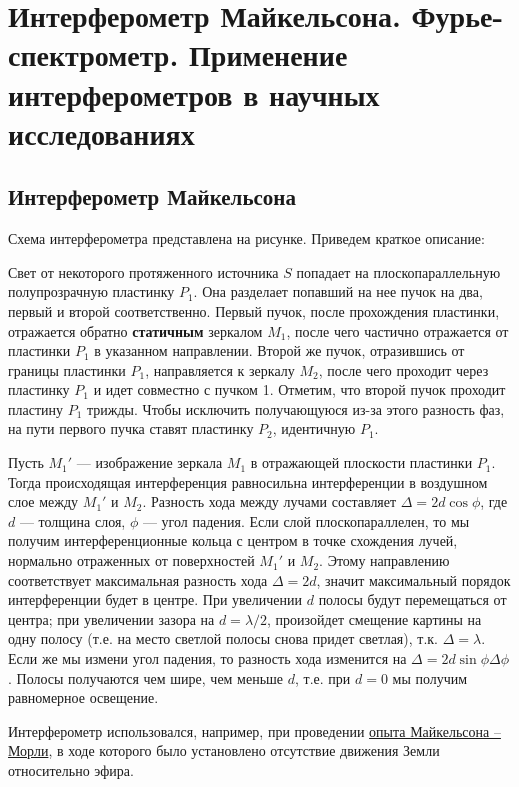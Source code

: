 \section{Интерферометр Майкельсона. Фурье-спектрометр. Применение интерферометров в научных исследованиях}

\subsection{Интерферометр Майкельсона}

Схема интерферометра представлена на рисунке. %
Приведем краткое описание:

Свет от некоторого протяженного источника $S$ попадает на плоскопараллельную полупрозрачную пластинку $P_1$. Она разделает попавший на нее пучок на два, первый и второй соответственно. Первый пучок, после прохождения пластинки, отражается обратно \textbf{статичным} зеркалом $M_1$, после чего частично отражается от пластинки $P_1$ в указанном направлении. Второй же пучок, отразившись от границы пластинки $P_1$, направляется к зеркалу $M_2$, после чего проходит через пластинку $P_1$ и идет совместно с пучком 1. Отметим, что второй пучок проходит пластину $P_1$ трижды. Чтобы исключить получающуюся из-за этого разность фаз, на пути первого пучка ставят пластинку $P_2$, идентичную $P_1$.

Пусть $M_1'$ --- изображение зеркала $M_1$ в отражающей плоскости пластинки $P_1$. Тогда происходящая интерференция равносильна интерференции в воздушном слое между $M_1'$ и $M_2$. Разность хода между лучами составляет $\Delta = 2 d\cos \phi$, где $d$ --- толщина слоя, $\phi$ --- угол падения. Если слой плоскопараллелен, то мы получим интерференционные кольца с центром в точке схождения лучей, нормально отраженных от поверхностей $M_1'$ и $M_2$. Этому направлению соответствует максимальная разность хода $\Delta = 2 d$, значит максимальный порядок интерференции будет в центре. При увеличении $d$ полосы будут перемещаться от центра; при увеличении зазора на $d = \lambda/2$, произойдет смещение картины на одну полосу (т.е. на место светлой полосы снова придет светлая), т.к. $\Delta = \lambda$. Если же мы измени угол падения, то разность хода изменится на $\Delta = 2 d \sin\phi \Delta\phi$. Полосы получаются чем шире, чем меньше $d$, т.е. при $d = 0$ мы получим равномерное освещение.

Интерферометр использовался, например, при проведении  \href{https://elementy.ru/trefil/21167/Opyt_MaykelsonaMorli}{опыта Майкельсона -- Морли}, в ходе которого было установлено отсутствие движения Земли относительно эфира.

